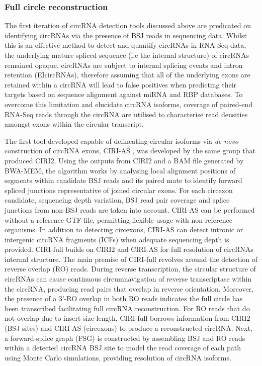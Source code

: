 \subsubsection{Full circle reconstruction} \label{Full circle reconstruction}
The first iteration of circRNA detection tools discussed above are predicated on identifying circRNAs via the presence of BSJ reads in sequencing data. Whilst this is an effective method to detect and quantify circRNAs in RNA-Seq data, the underlying mature spliced sequence (i.e the internal structure) of circRNAs remained opaque. circRNAs are subject to internal splicing events and intron retention (EIcircRNAs), therefore assuming that all of the underlying exons are retained within a circRNA will lead to false positives when predicting their targets based on sequence alignment against miRNA and RBP databases. To overcome this limitation and elucidate circRNA isoforms, coverage of paired-end RNA-Seq reads through the circRNA are utilised to characterise read densities amongst exons within the circular transcript. \par
The first tool developed capable of delineating circular isoforms via \textit{de novo} construction of circRNA exons, CIRI-AS \cite{CIRI-AS}, was developed by the same group that produced CIRI2. Using the outputs from CIRI2 and a BAM file generated by BWA-MEM, the algorithm works by analysing local alignment positions of segments within candidate BSJ reads and its paired mate to identify forward spliced junctions representative of joined circular exons. For each circexon candidate, sequencing depth variation, BSJ read pair coverage and splice junctions from non-BSJ reads are taken into account. CIRI-AS can be performed without a reference GTF file, permitting flexible usage with non-reference organisms. In addition to detecting circexons, CIRI-AS can detect intronic or intergenic circRNA fragments (ICFs) when adequate sequencing depth is provided. CIRI-full \cite{CIRI-full} builds on CIRI2 and CIRI-AS for full resolution of circRNAs internal structure. The main premise of CIRI-full revolves around the detection of reverse overlap (RO) reads. During reverse transcription, the circular structure of circRNAs can cause continuous circumnavigation of reverse transcriptase within the circRNA, producing read pairs that overlap in reverse orientation. Moreover, the presence of a 3'-RO overlap in both RO reads indicates the full circle has been transcribed facilitating full circRNA reconstruction. For RO reads that do not overlap due to insert size length, CIRI-full borrows information from CIRI2 (BSJ sites) and CIRI-AS (circexons) to produce a reconstructed circRNA. Next, a forward-splice graph (FSG) is constructed by assembling BSJ and RO reads within a detected circRNA BSJ site to model the read coverage of each path using Monte Carlo simulations, providing resolution of circRNA isoforms. \par
